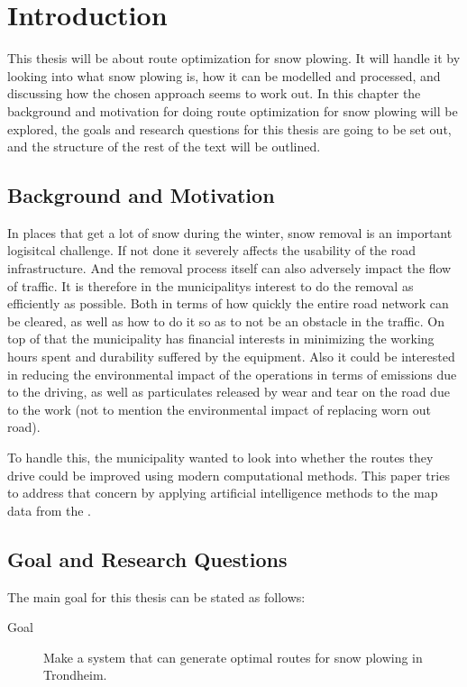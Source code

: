\chapter{Introduction}

This thesis will be about route optimization for snow plowing. It will handle it by looking into what snow plowing is, how it can be modelled and processed, and discussing how the chosen approach seems to work out. In this chapter the background and motivation for doing route optimization for snow plowing will be explored, the goals and research questions for this thesis are going to be set out, and the structure of the rest of the text will be outlined.

\section{Background and Motivation}

In places that get a lot of snow during the winter, snow removal is an important logisitcal challenge. If not done it severely affects the usability of the road infrastructure. And the removal process itself can also adversely impact the flow of traffic. It is therefore in the municipalitys interest to do the removal as efficiently as possible. Both in terms of how quickly the entire road network can be cleared, as well as how to do it so as to not be an obstacle in the traffic. On top of that the municipality has financial interests in minimizing the working hours spent and durability suffered by the equipment. Also it could be interested in reducing the environmental impact of the operations in terms of emissions due to the driving, as well as particulates released by wear and tear on the road due to the work (not to mention the environmental impact of replacing worn out road).

To handle this, the municipality wanted to look into whether the routes they drive could be improved using modern computational methods. This paper tries to address that concern by applying artificial intelligence methods to the map data from the .

\section{Goal and Research Questions}

The main goal for this thesis can be stated as follows:

\begin{description}
	\item [Goal] Make a system that can generate optimal routes for snow plowing in Trondheim.
\end{description}


